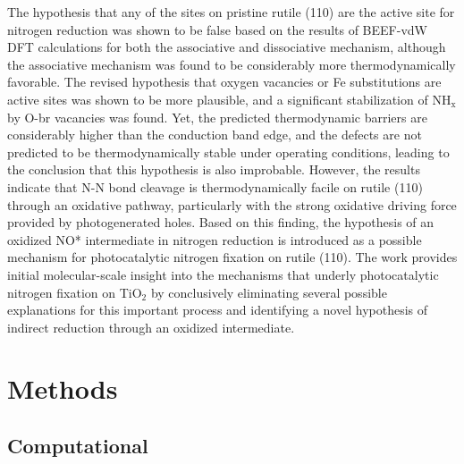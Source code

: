 \documentclass[journal=ascecg,manuscript=article,articletitle=true]{achemso}
\begin{document}
The hypothesis that any of the sites on pristine rutile (110) are the active site for nitrogen reduction was shown to be false based on the results of BEEF-vdW DFT calculations for both the associative and dissociative mechanism, although the associative mechanism was found to be considerably more thermodynamically favorable. The revised hypothesis that oxygen vacancies or Fe substitutions are active sites was shown to be more plausible, and a significant stabilization of NH$_{\mathrm{x}}$ by O-br vacancies was found. Yet, the predicted thermodynamic barriers are considerably higher  than the conduction band edge, and the defects are not predicted to be thermodynamically stable under operating conditions, leading to the conclusion that this hypothesis is also improbable. However, the results indicate that N-N bond cleavage is thermodynamically facile on rutile (110) through an oxidative pathway, particularly with the strong oxidative driving force provided by photogenerated holes. Based on this finding, the hypothesis of an oxidized NO* intermediate in nitrogen reduction is introduced as a possible mechanism for photocatalytic nitrogen fixation on rutile (110). The work provides initial molecular-scale insight into the mechanisms that underly photocatalytic nitrogen fixation on TiO$_2$ by conclusively eliminating several possible explanations for this important process and identifying a novel hypothesis of indirect reduction through an oxidized intermediate.

\section{Methods}
\label{sec:methods}
\subsection{Computational}
\end{document}
